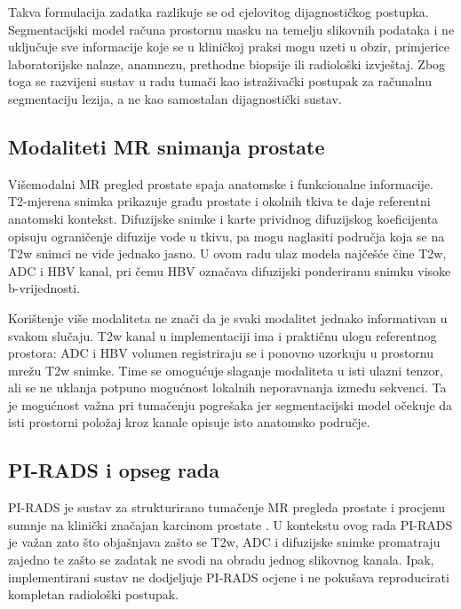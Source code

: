 \documentclass[a4paper,12pt,oneside]{article}
\begin{document}
Takva formulacija zadatka razlikuje se od cjelovitog dijagnostičkog postupka. Segmentacijski model računa prostornu masku na temelju slikovnih podataka i ne uključuje sve informacije koje se u kliničkoj praksi mogu uzeti u obzir, primjerice laboratorijske nalaze, anamnezu, prethodne biopsije ili radiološki izvještaj. Zbog toga se razvijeni sustav u radu tumači kao istraživački postupak za računalnu segmentaciju lezija, a ne kao samostalan dijagnostički sustav.


\subsection{Modaliteti MR snimanja prostate}

Višemodalni MR pregled prostate spaja anatomske i funkcionalne informacije. T2-mjerena snimka prikazuje građu prostate i okolnih tkiva te daje referentni anatomski kontekst. Difuzijske snimke i karte prividnog difuzijskog koeficijenta opisuju ograničenje difuzije vode u tkivu, pa mogu naglasiti područja koja se na T2w snimci ne vide jednako jasno. U ovom radu ulaz modela najčešće čine T2w, ADC i HBV kanal, pri čemu HBV označava difuzijski ponderiranu snimku visoke b-vrijednosti.

Korištenje više modaliteta ne znači da je svaki modalitet jednako informativan u svakom slučaju. T2w kanal u implementaciji ima i praktičnu ulogu referentnog prostora: ADC i HBV volumen registriraju se i ponovno uzorkuju u prostornu mrežu T2w snimke. Time se omogućuje slaganje modaliteta u isti ulazni tenzor, ali se ne uklanja potpuno mogućnost lokalnih neporavnanja između sekvenci. Ta je mogućnost važna pri tumačenju pogrešaka jer segmentacijski model očekuje da isti prostorni položaj kroz kanale opisuje isto anatomsko područje.

\subsection{PI-RADS i opseg rada}

PI-RADS je sustav za strukturirano tumačenje MR pregleda prostate i procjenu sumnje na klinički značajan karcinom prostate \cite{pirads_v21}. U kontekstu ovog rada PI-RADS je važan zato što objašnjava zašto se T2w, ADC i difuzijske snimke promatraju zajedno te zašto se zadatak ne svodi na obradu jednog slikovnog kanala. Ipak, implementirani sustav ne dodjeljuje PI-RADS ocjene i ne pokušava reproducirati kompletan radiološki postupak.
\end{document}

